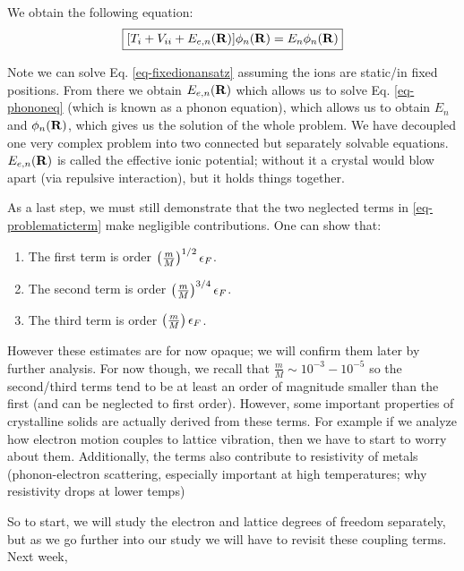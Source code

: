 We obtain the following equation:
\begin{equation}\label{eq-phononeq}
    \boxed{[T_i + V_{ii} + E_{e, n}(\mathbf{R})]\phi_n(\mathbf{R}) = E_n\phi_n(\mathbf{R})}
\end{equation}

Note we can solve Eq. \eqref{eq-fixedionansatz} assuming the ions are static/in fixed positions. From there we obtain $E_{e, n}(\mathbf{R})$ which allows us to solve Eq. \eqref{eq-phononeq} (which is known as a phonon equation), which allows us to obtain $E_n$ and $\phi_n(\mathbf{R})$, which gives us the solution of the whole problem. We have decoupled one very complex problem into two connected but separately solvable equations. $E_{e, n}(\mathbf{R})$ is called the effective ionic potential; without it a crystal would blow apart (via repulsive interaction), but it holds things together. 

As a last step, we must still demonstrate that the two neglected terms in \eqref{eq-problematicterm} make negligible contributions. One can show that:
\begin{enumerate}
    \item The first term is order $\left(\frac{m}{M}\right)^{1/2}\epsilon_F$.
    \item The second term is order $\left(\frac{m}{M}\right)^{3/4}\epsilon_F$.
    \item The third term is order $\left(\frac{m}{M}\right)\epsilon_F$.
\end{enumerate}

However these estimates are for now opaque; we will confirm them later by further analysis. For now though, we recall that $\frac{m}{M} \sim 10^{-3}-10^{-5}$ so the second/third terms tend to be at least an order of magnitude smaller than the first (and can be neglected to first order). However, some important properties of crystalline solids are actually derived from these terms. For example if we analyze how electron motion couples to lattice vibration, then we have to start to worry about them. Additionally, the terms also contribute to resistivity of metals (phonon-electron scattering, especially important at high temperatures; why resistivity drops at lower temps)

So to start, we will study the electron and lattice degrees of freedom separately, but as we go further into our study we will have to revisit these coupling terms. Next week,